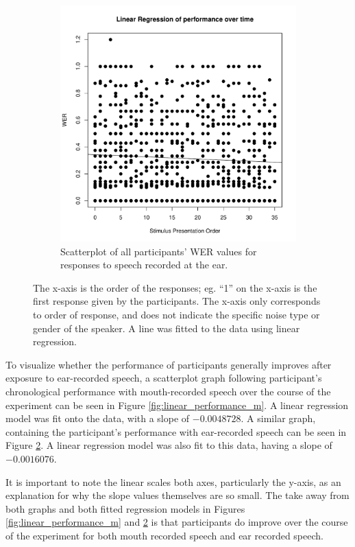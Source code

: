 \documentclass[dissertation,copyright]{uathesis}
\makeatletter
\def\maxwidth{ %
  \ifdim\Gin@nat@width>\linewidth
    \linewidth
  \else
    \Gin@nat@width
  \fi
}
\makeatother
\begin{document}
\begin{figure}
\begin{subfigure}{0.47\textwidth}
\includegraphics[width=\maxwidth]{figure/line_graph_chrono-1} 

\caption{Scatterplot of all participants' WER values for responses to speech recorded at the ear.}
\label{fig:linear_performance_e}
\end{subfigure}
\caption{The x-axis is the order of the responses; eg. ``1'' on the x-axis is the first response given by the participants.  The x-axis only corresponds to order of response, and does not indicate the specific noise type or gender of the speaker.  A line was fitted to the data using linear regression.}
\end{figure}

To visualize whether the performance of participants generally improves after exposure to ear-recorded speech, a scatterplot graph following participant's chronological performance with mouth-recorded speech over the course of the experiment can be seen in Figure \ref{fig:linear_performance_m}. A linear regression model was fit onto the data, with a slope of $-0.0048728$.
A similar graph, containing the participant's performance with ear-recorded speech can be seen in Figure \ref{fig:linear_performance_e}.  A linear regression model was also fit to this data, having a slope of $-0.0016076$.

It is important to note the linear scales both axes, particularly the y-axis, as an explanation for why the slope values themselves are so small.  The take away from both graphs and both fitted regression models in Figures \ref{fig:linear_performance_m} and \ref{fig:linear_performance_e} is that participants do improve over the course of the experiment for both mouth recorded speech and ear recorded speech.
\end{document}
